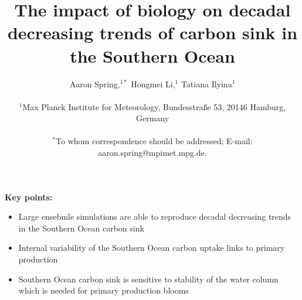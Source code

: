 \documentclass[12pt]{article}
\title{The impact of biology on decadal decreasing trends of carbon sink in the Southern Ocean}
\author
{Aaron Spring,$^{1\ast}$ Hongmei Li,$^{1}$ Tatiana Ilyina$^{1}$\\
\\
\normalsize{$^{1}$Max Planck Institute for Meteorology, Bundesstra{\ss}e 53, 20146 Hamburg, Germany}\\
\\
\normalsize{$^\ast$To whom correspondence should be addressed; E-mail:  aaron.spring@mpimet.mpg.de.}
}
\date{}
\begin{document}
 


\baselineskip24pt


\maketitle 

\vspace{3cm}
\textbf{Key points:}

\begin{itemize}
\item Large ensebmle simulations are able to reproduce decadal decreasing trends in the Southern Ocean carbon sink
\item Internal variability of the Southern Ocean carbon uptake links to primary production
\item Southern Ocean carbon sink is sensitive to stability of the water column which is needed for primary production blooms
\end{itemize}


\newpage
\end{document}
